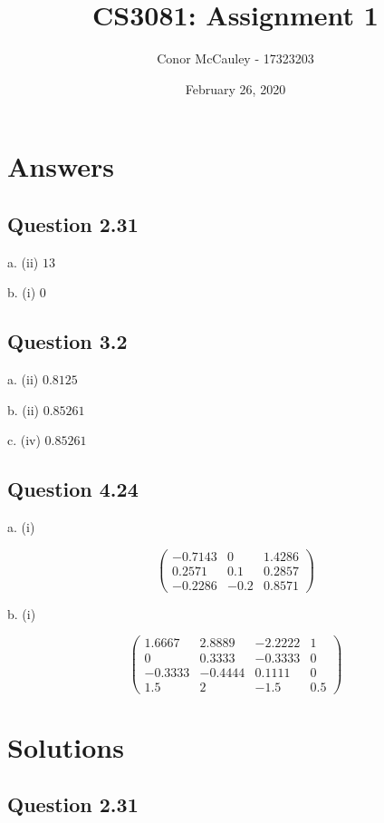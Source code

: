 \documentclass[12pt]{article}
\title{CS3081: Assignment 1}
\author{Conor McCauley - 17323203}
\date{February 26, 2020}
\begin{document}
\maketitle

\section*{Answers}

\subsection*{Question 2.31}

\noindent a. (ii) $13$

\noindent b. (i) $0$

\subsection*{Question 3.2}

\noindent a. (ii) $0.8125$

\noindent b. (ii) $0.85261$

\noindent c. (iv) $0.85261$

\subsection*{Question 4.24}

\noindent a. (i)

$$
\begin{pmatrix}
    -0.7143 & 0 & 1.4286 \\
    0.2571 & 0.1 & 0.2857 \\
    -0.2286 & -0.2 & 0.8571
\end{pmatrix}
$$

\noindent b. (i)

$$
\begin{pmatrix}
    1.6667 & 2.8889 & -2.2222 & 1 \\
    0 & 0.3333 & -0.3333 & 0 \\
    -0.3333 & -0.4444 & 0.1111 & 0 \\
    1.5 & 2 & -1.5 & 0.5
\end{pmatrix}
$$

\section*{Solutions}

\subsection*{Question 2.31}
\end{document}
